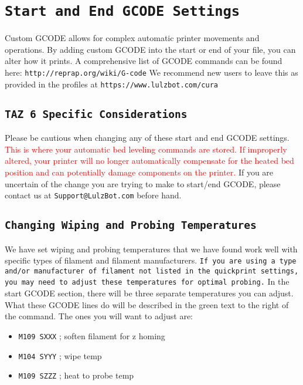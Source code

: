 \section{\texttt{Start and End GCODE Settings}}
Custom GCODE allows for complex automatic printer movements and operations. By adding custom GCODE into the start or end of your file, you can alter how it prints. A comprehensive list of GCODE commands can be found here: \texttt{http://reprap.org/wiki/G-code} We recommend new users to leave this as provided in the profiles at \texttt{https://www.lulzbot.com/cura}

\subsection{\texttt{TAZ 6 Specific Considerations}}
Please be cautious when changing any of these start and end GCODE settings. \textcolor{red}{This is where your automatic bed leveling commands are stored. If improperly altered, your printer will no longer automatically compensate for the heated bed position and can potentially damage components on the printer.} If you are uncertain of the change you are trying to make to start/end GCODE, please contact us at \texttt{Support@LulzBot.com} before hand.


\subsection{\texttt{Changing Wiping and Probing Temperatures}} \label{sssec:num1}
We have set wiping and probing temperatures that we have found work well with specific types of filament and filament manufacturers. \texttt{If you are using a type and/or manufacturer of filament not listed in the quickprint settings, you may need to adjust these temperatures for optimal probing.} In the start GCODE section, there will be three separate temperatures you can adjust. What these GCODE lines do will be described in the \textcolor{green2}{green text} to the right of the command. The ones you will want to adjust are:
\begin{itemize}
\item \texttt{M109 SXXX}                    \textcolor{green2}{; soften filament for z homing}
\item \texttt{M104 SYYY}                    \textcolor{green2}{; wipe temp}
\item \texttt{M109 SZZZ}                    \textcolor{green2}{; heat to probe temp}
\end{itemize}

